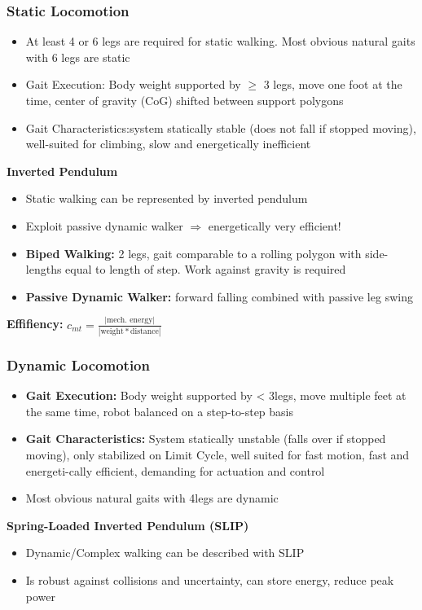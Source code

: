 \documentclass[fontsize=6pt]{scrartcl}
\begin{document}
\begin{multicols*}{4}
\subsubsection*{Static Locomotion}
\begin{itemize}
	\item At least 4 or 6 legs are required for static walking. Most obvious natural gaits
		  with 6 legs are static
	\item Gait Execution: Body weight supported by $\geq$ 3 legs, move one foot at the time,
		  center of gravity (CoG) shifted between support polygons
	\item Gait Characteristics:system statically stable (does not fall if stopped moving),
		  well-suited for climbing, slow and energetically inefficient
\end{itemize}
\textbf{Inverted Pendulum}
\begin{itemize}
	\item Static walking can be represented by inverted pendulum
	\item Exploit passive dynamic walker $\Rightarrow$ energetically very efficient!
	\item \textbf{Biped Walking:} 2 legs, gait comparable to a rolling polygon with
		  side-lengths equal to length of step. Work against gravity is required
	  \item \textbf{Passive Dynamic Walker:} forward falling combined with passive leg swing
\end{itemize}
\textbf{Effifiency:} $c_{mt} = \frac{|\text{mech. energy}|}{|\text{weight} * \text{distance}|}$

\subsubsection*{Dynamic Locomotion}
\begin{itemize}
	\item \textbf{Gait Execution:} Body weight supported by < 3legs, move multiple
		  feet at the same time, robot balanced on a step-to-step basis
	\item \textbf{Gait Characteristics:} System statically unstable (falls over if
		  stopped moving), only stabilized on Limit Cycle, well suited for fast motion,
		  fast and energeti-cally efficient, demanding for actuation and control
	\item Most obvious natural gaits with 4legs are dynamic
\end{itemize}
\textbf{Spring-Loaded Inverted Pendulum (SLIP)}
\begin{itemize}
	\item Dynamic/Complex walking can be described with SLIP
	\item Is robust against collisions and uncertainty, can store energy, reduce peak power
\end{itemize}


\end{multicols*}
\end{document}
